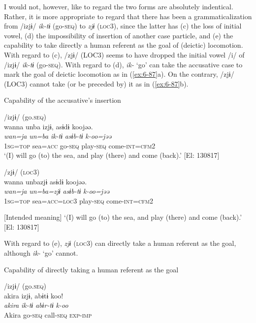 \begin{table}
  I would not, however, like to regard the two forms are absolutely indentical. Rather, it is more appropriate to regard that there has been a grammaticalization from /izjɨ/ \textit{ik-tɨ} (go-\textsc{seq}) to \textit{zjɨ} (\textsc{loc}3), since the latter has (c) the loss of initial vowel, (d) the impossibility of insertion of another case particle, and (e) the capability to take directly a human referent as the goal of (deictic) locomotion. With regard to (c), /zjɨ/ (LOC3) seems to have dropped the initial vowel /i/ of /izjɨ/ \textit{ik-tɨ} (go-\textsc{seq}). With regard to (d), \textit{ik-} ‘go’ can take the accusative case to mark the goal of deictic locomotion as in (\ref{ex:6-87}a). On the contrary, /zjɨ/ (LOC3) cannot take (or be preceded by) it as in (\ref{ex:6-87}b).

\ea\label{ex:6-87}
  Capability of the accusative’s insertion

 \ea /izjɨ/ (go.\textsc{seq})\\
{\TM}
\glll  wanna  unba  izjɨ,  asɨdɨ  koojəə.\\
\textit{wan=ja}  \textit{un=ba}  \textit{ik-tɨ}  \textit{asɨb-tɨ}  \textit{k-oo=jəə}\\
1\textsc{sg}=\textsc{top}  sea=\textsc{acc}  go-\textsc{seq}  play-\textsc{seq}  come-\textsc{int}=\textsc{cfm}2\\
\glt ‘(I) will go (to) the sea, and play (there) and come (back).’ [El: 130817]

\ex /zjɨ/ (\textsc{loc}3)\\
{\TM}
\glll  *wanna  unbazjɨ  asɨdɨ  koojəə.\\
\textit{wan=ja}  \textit{un=ba=zjɨ}  \textit{asɨb-tɨ}  \textit{k-oo=jəə}\\
1\textsc{sg}=\textsc{top}  sea=\textsc{acc}=\textsc{loc}3  play-\textsc{seq}  come-\textsc{int}=\textsc{cfm}2

      [Intended meaning] ‘(I) will go (to) the sea, and play (there) and come (back).’ [El: 130817]

With regard to (e), \textit{zjɨ} (\textsc{loc}3) can directly take a human referent as the goal, although \textit{ik-} ‘go’ cannot.

\ea\label{ex:6-88}
  Capability of directly taking a human referent as the goal

 \ea /izjɨ/ (go.\textsc{seq})\\
{\TM}
\glll  *akira  izjɨ,  abɨtɨ  koo!\\
\textit{akira}  \textit{ik-tɨ}  \textit{abɨr-tɨ}  \textit{k-oo}\\
Akira  go-\textsc{seq}  call-\textsc{seq}  \textsc{exp}-\textsc{imp}


\end{table}
